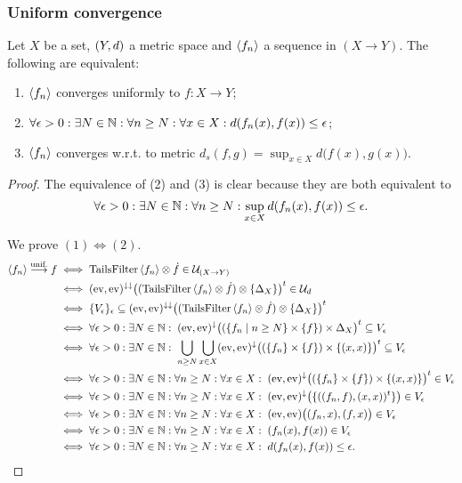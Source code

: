\subsubsection{Uniform convergence}
\begin{proposition} \label{metricUniformConvergence}
Let $X$ be a set, $\sSet{Y,d}$ a metric space and $\left\langle f_n \right\rangle$ a sequence in $(X\to Y)$. The following are equivalent:
\begin{enumerate}
\item  $\left\langle f_n \right\rangle$ converges uniformly to $f: X\to Y$;
\item $\forall \epsilon > 0: \exists N\in \mathbb{N}: \forall n \geq N: \forall x\in X:  d(f_n(x), f(x)) \leq \epsilon$;
\item $\left\langle f_n \right\rangle$ converges w.r.t. to metric $d_s(f,g) = \sup_{x\in X}d\big(f(x), g(x)\big)$.
\end{enumerate}
\end{proposition}
\begin{proof}
The equivalence of (2) and (3) is clear because they are both equivalent to
\[ \forall \epsilon > 0: \exists N\in \mathbb{N}: \forall n \geq N: \sup_{x\in X} d(f_n(x), f(x)) \leq \epsilon. \]

We prove $(1) \Leftrightarrow (2)$.
\begin{align*}
\seq{f_n} \overset{\text{unif.}}{\longrightarrow} f &\iff \TailsFilter\seq{f_n} \otimes \pfilter{f} \in \mathcal{U}_{(X\to Y)} \\
&\iff (\evalMap, \evalMap)^{\imf\imf}\big((\TailsFilter\seq{f_n} \otimes \pfilter{f})\otimes \{\Delta_X\}\big)^\ttransp \in \mathcal{U}_d \\
&\iff \{V_\epsilon\}_\epsilon \subseteq (\evalMap, \evalMap)^{\imf\imf}\big((\TailsFilter\seq{f_n} \otimes \pfilter{f})\otimes \{\Delta_X\}\big)^\ttransp \\
&\iff \forall \epsilon>0: \exists N\in \N: \; (\evalMap, \evalMap)^{\imf}\big((\setbuilder{f_n}{n\geq N} \times \{f\})\times \Delta_X\big)^\ttransp \subseteq V_\epsilon \\
&\iff \forall \epsilon>0: \exists N\in \N: \; \bigcup_{n\geq N}\bigcup_{x\in X}(\evalMap, \evalMap)^{\imf}\big((\{f_n\} \times \{f\})\times \{(x,x)\}\big)^\ttransp \subseteq V_\epsilon \\
&\iff \forall \epsilon>0: \exists N\in \N: \forall n\geq N: \forall x\in X: \;(\evalMap, \evalMap)^{\imf}\big((\{f_n\} \times \{f\})\times \{(x,x)\}\big)^\ttransp \in V_\epsilon \\
&\iff \forall \epsilon>0: \exists N\in \N: \forall n\geq N: \forall x\in X: \; (\evalMap, \evalMap)^{\imf}\big(\{((f_n, f), (x,x))^\ttransp\}\big) \in V_\epsilon \\
&\iff \forall \epsilon>0: \exists N\in \N: \forall n\geq N: \forall x\in X: \; (\evalMap, \evalMap)\big((f_n,x),(f,x)\big) \in V_\epsilon \\
&\iff \forall \epsilon>0: \exists N\in \N: \forall n\geq N: \forall x\in X: \; (f_n(x), f(x)) \in V_\epsilon \\
&\iff \forall \epsilon>0: \exists N\in \N: \forall n\geq N: \forall x\in X: \; d(f_n(x), f(x)) \leq \epsilon.
\end{align*}
\end{proof}

